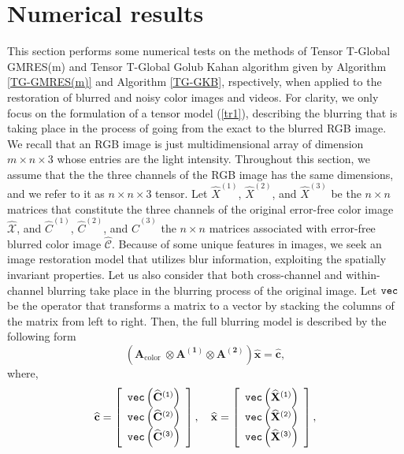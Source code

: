 \documentclass{siamltex}
\newcommand{\1}{\mathbb{1}}
\newcommand{\0}{\mathbb{0}}
\begin{document}
	\section{Numerical results}
	This section performs some numerical tests on the methods of Tensor T-Global GMRES(m) and Tensor T-Global Golub Kahan algorithm given by Algorithm \ref{TG-GMRES(m)} and Algorithm \ref{TG-GKB}, rspectively, 
	when applied to the restoration of blurred and noisy color images and videos. For clarity, we only focus on the formulation of a tensor model (\ref{tr1}), describing the blurring that is taking place in the process of going from the exact to the blurred RGB image.  We recall that an RGB image is just multidimensional array of dimension $m\times n\times 3$ whose entries are the light intensity. Throughout this section, we assume that the the three channels
	of the RGB image has the same dimensions, and we refer to it as $n\times n\times 3$ tensor. Let $\widehat{X}^{(1)}$, $\widehat{X}^{(2)}$, and $\widehat{X}^{(3)}$ be the $n\times n$ matrices that constitute the three channels of the original error-free color image $\widehat{\mathscr{X}}$, and $\widehat{C}^{(1)}$, $\widehat{C}^{(2)}$, and $\widehat{C}^{(3)}$ the $n\times n$ matrices associated with error-free blurred color image $\widehat{\mathscr{C}}$. Because of some
	unique features in images, we seek an image restoration model that utilizes blur information,
	exploiting the spatially invariant properties. Let us also consider that both cross-channel and within-channel blurring  take place in the blurring process of the original image. Let $\tt{vec}$ be the operator  that
	transforms a matrix  to a vector  by stacking the columns of the matrix from
	left to right. Then, the full blurring model is described by the following
	form 
	\begin{equation}\label{linmodel}
	\left(\mathbf{A}_{\text {color }} \otimes \mathbf{A^{(1)}}\otimes\mathbf{A^{(2)}}\right) \widehat{\mathbf{x}}=\widehat{\mathbf{c}},
	\end{equation}
	where, 
	$$ \widehat{\mathbf{c}}=\left[\begin{array}{c}
	\tt{vec}\left(\widehat{\mathbf{C}}^{(1)}\right) \\
	\tt{vec}\left(\widehat{\mathbf{C}}^{(2)}\right) \\
	\tt{vec}\left(\widehat{\mathbf{C}}^{(3)}\right)
	\end{array}\right], \quad \widehat{\mathbf{x}}=\left[\begin{array}{c}
	\tt{vec}\left(\widehat{\mathbf{X}}^{(1)}\right) \\
	\tt{vec}\left(\widehat{\mathbf{X}}^{(2)}\right) \\
	\tt{vec}\left(\widehat{\mathbf{X}}^{(3)}\right)
	\end{array}\right], $$
\end{document}
